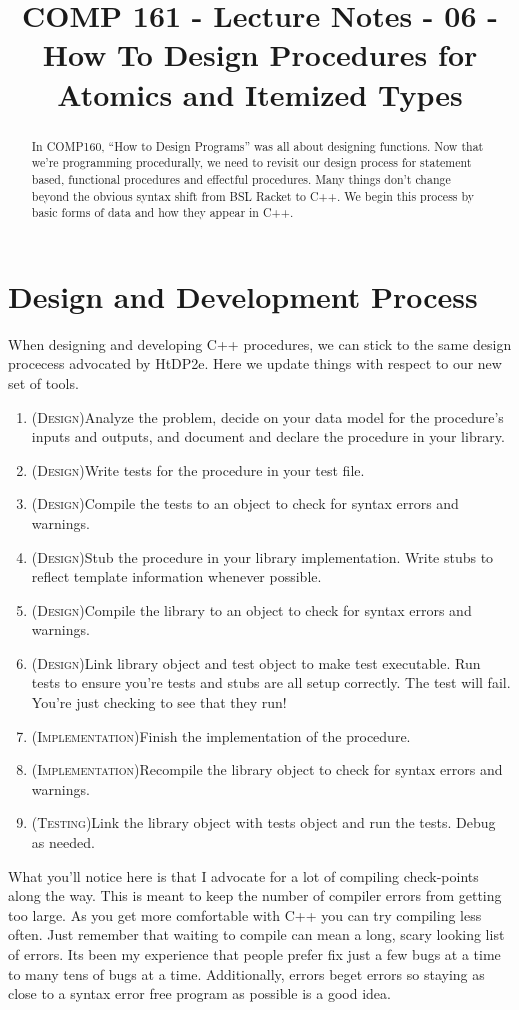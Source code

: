 \documentclass[]{tufte-handout}
\title{COMP 161 - Lecture Notes - 06 - How To Design Procedures for Atomics and Itemized Types}
\begin{document}
 
\maketitle

\begin{abstract}
In COMP160, ``How to Design Programs'' was all about designing functions.  Now that we're programming procedurally, we need to revisit our design process for statement based, functional procedures and effectful procedures. Many things don't change beyond the obvious syntax shift from BSL Racket to C++.   We begin this process by basic forms of data and how they appear in C++.
\end{abstract}

\section{Design and Development Process}

When designing and developing C++ procedures, we can stick to the same design procecess advocated by HtDP2e. Here we update things with respect to our new set of tools.
\begin{enumerate}
\item (\textsc{Design})Analyze the problem, decide on your data model for the procedure's inputs and outputs, and document and declare the procedure in your library.
\item (\textsc{Design})Write tests for the procedure in your test file. 
\item (\textsc{Design})Compile the tests to an object to check for syntax errors and warnings.  
\item (\textsc{Design})Stub the procedure in your library implementation. Write stubs to reflect template information whenever possible.
\item (\textsc{Design})Compile the library to an object to check for syntax errors and warnings. 
\item (\textsc{Design})Link library object and test object to make test executable. Run tests to ensure you're tests and stubs are all setup correctly. The test will fail. You're just checking to see that they run!
\item (\textsc{Implementation})Finish the implementation of the procedure. 
\item (\textsc{Implementation})Recompile the library object to check for syntax errors and warnings.
\item (\textsc{Testing})Link the library object with tests object and run the tests. Debug as needed.
\end{enumerate}
What you'll notice here is that I advocate for a lot of compiling check-points along the way. This is meant to keep the number of compiler errors from getting too large. As you get more comfortable with C++ you can try compiling less often. Just remember that waiting to compile can mean a long, scary looking list of errors.  Its been my experience that people prefer fix just a few bugs at a time to many tens of bugs at a time.  Additionally, errors beget errors so staying as close to a syntax error free program as possible is a good idea.
\end{document}
